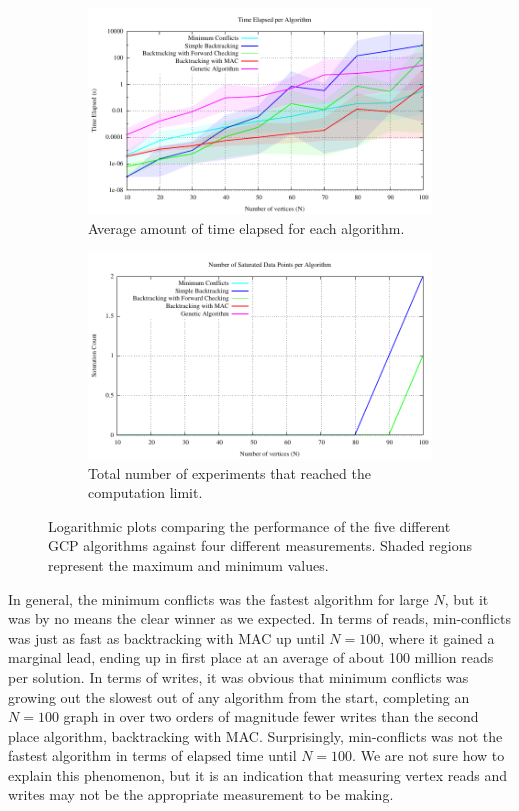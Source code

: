 \documentclass{article}
\begin{document}
\begin{figure}[h!]
\begin{subfigure}{0.49\textwidth}
				\includegraphics[width=\textwidth]{../results_5/comparing_time_performance}
				\caption{Average amount of time elapsed for each algorithm.}
			\end{subfigure}
			\;
			\begin{subfigure}{0.49\textwidth}
				\centering
				\includegraphics[width=\textwidth]{../results_5/comparing_num_saturated}
				\caption{Total number of experiments that reached the computation limit.}
			\end{subfigure}
			\caption{Logarithmic plots comparing the performance of the five different GCP algorithms against four different measurements. Shaded regions represent the maximum and minimum values.}
			\label{results}
		\end{figure}
		
		In general, the minimum conflicts was the fastest algorithm for large $N$, but it was by no means the clear winner as we expected. In terms of reads, min-conflicts was just as fast as backtracking with MAC up until $N=100$, where it gained a marginal lead, ending up in first place at an average of about 100 million reads per solution. In terms of writes, it was obvious that minimum conflicts was growing out the slowest out of any algorithm from the start, completing an $N=100$ graph in over two orders of magnitude fewer writes than the second place algorithm, backtracking with MAC. Surprisingly, min-conflicts was not the fastest algorithm in terms of elapsed time until $N=100$. We are not sure how to explain this phenomenon, but it is an indication that measuring vertex reads and writes may not be the appropriate measurement to be making.
		
\end{document}
